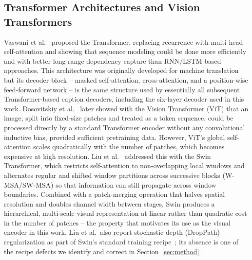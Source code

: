 \documentclass[conference]{IEEEtran}
\begin{document}
\subsection{Transformer Architectures and Vision Transformers}
Vaswani et al.~\cite{vaswani2017attention} proposed the Transformer, replacing recurrence with multi-head self-attention and showing that sequence modeling could be done more efficiently and with better long-range dependency capture than RNN/LSTM-based approaches. This architecture was originally developed for machine translation but its decoder block -- masked self-attention, cross-attention, and a position-wise feed-forward network -- is the same structure used by essentially all subsequent Transformer-based caption decoders, including the six-layer decoder used in this work. Dosovitskiy et al.~\cite{dosovitskiy2020vit} later showed with the Vision Transformer (ViT) that an image, split into fixed-size patches and treated as a token sequence, could be processed directly by a standard Transformer encoder without any convolutional inductive bias, provided sufficient pretraining data. However, ViT's global self-attention scales quadratically with the number of patches, which becomes expensive at high resolution. Liu et al.~\cite{liu2021swin} addressed this with the Swin Transformer, which restricts self-attention to non-overlapping local windows and alternates regular and shifted window partitions across successive blocks (W-MSA/SW-MSA) so that information can still propagate across window boundaries. Combined with a patch-merging operation that halves spatial resolution and doubles channel width between stages, Swin produces a hierarchical, multi-scale visual representation at linear rather than quadratic cost in the number of patches -- the property that motivates its use as the visual encoder in this work. Liu et al.\ also report stochastic-depth (DropPath) regularization as part of Swin's standard training recipe~\cite{liu2021swin}; its absence is one of the recipe defects we identify and correct in Section~\ref{sec:method}.
\end{document}
